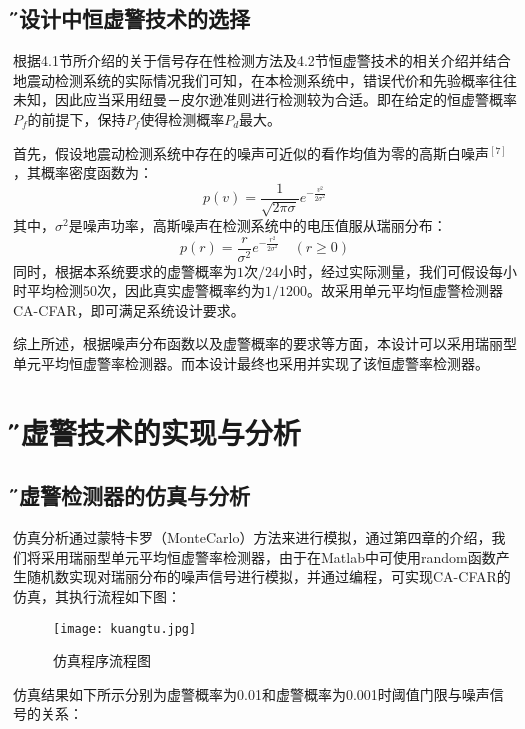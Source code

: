 \documentclass[12pt,a4paper]{article} %
\newcommand{\xiaosanhao}{\fontsize{15pt}{\baselineskip}\selectfont}    %
\begin{document}
	\subsection{\H 本设计中恒虚警技术的选择 } 
根据4.1节所介绍的关于信号存在性检测方法及4.2节恒虚警技术的相关介绍并结合地震动检测系统的实际情况我们可知，在本检测系统中，错误代价和先验概率往往未知，因此应当采用纽曼－皮尔逊准则进行检测较为合适。即在给定的恒虚警概率$P_f$的前提下，保持$P_f$使得检测概率$P_d$最大。
 	\par 首先，假设地震动检测系统中存在的噪声可近似的看作均值为零的高斯白噪声$^{[7]}$，其概率密度函数为：
	\begin{equation}
	p(v) = \frac{1}{\sqrt{2\pi\sigma}}e^{-\frac{v^2}{2\sigma^2}}
	\end{equation}
	其中，$\sigma^2$是噪声功率，高斯噪声在检测系统中的电压值服从瑞丽分布：
	\begin{equation}
	p(r) = \frac{r}{\sigma^2}e^{-\frac{r^2}{2\sigma^2}}  {\quad(r    \geq    0)}
	\end{equation}
	同时，根据本系统要求的虚警概率为$1次/24小时$，经过实际测量，我们可假设每小时平均检测50次，因此真实虚警概率约为$1/1200$。故采用单元平均恒虚警检测器 CA-CFAR，即可满足系统设计要求。
	\par 综上所述，根据噪声分布函数以及虚警概率的要求等方面，本设计可以采用瑞丽型单元平均恒虚警率检测器。而本设计最终也采用并实现了该恒虚警率检测器。 
 	\newpage
  \section{\xiaosanhao \H  恒虚警技术的实现与分析}
  	\subsection{\H 恒虚警检测器的仿真与分析 }
仿真分析通过蒙特卡罗（MonteCarlo）方法来进行模拟，通过第四章的介绍，我们将采用瑞丽型单元平均恒虚警率检测器，由于在Matlab中可使用random函数产生随机数实现对瑞丽分布的噪声信号进行模拟，并通过编程，可实现CA-CFAR的仿真，其执行流程如下图：
  	\begin{figure}[htp] %
 		  \centering
 		  \texttt{[image: kuangtu.jpg]} 
  		  \caption{仿真程序流程图}
  		 \label{fig:1.1.1}
		\end{figure}
		\newpage
  	\par 仿真结果如下所示分别为虚警概率为0.01和虚警概率为0.001时阈值门限与噪声信号的关系：
 
 
 
\end{document}
